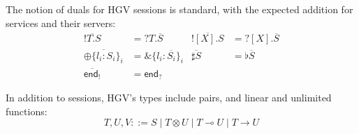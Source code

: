 \documentclass{easychair}
\newcommand{\key}{\mathsf}
\newcommand{\set}[1]{\{ #1 \}}
\newcommand{\row}[2]{\set{#1}_{#2}}
\newcommand{\gvOutput}[2]{\mathord{!}{#1}.{#2}}
\newcommand{\gvInput}[2]{\mathord{?}{#1}.{#2}}
\newcommand{\gvEndOutput}{\key{end}_!}
\newcommand{\gvEndInput}{\key{end}_?}
\newcommand{\gvPlus}[2]{\oplus \row{#1}{#2}}
\newcommand{\gvChoice}[2]{\binampersand \row{#1}{#2}}
\newcommand{\gvServer}[1]{\flat {#1}}
\newcommand{\gvService}[1]{\sharp {#1}}
\newcommand{\gvDual}[1]{\overline{#1}}
\newcommand{\gvOutputType}[2]{![{#1}].{#2}}
\newcommand{\gvInputType}[2]{?[{#1}].{#2}}
\newcommand{\la}{l}
\newcommand{\lolli}{\multimap}
\newcommand{\gvLinFun}[2]{{#1} \lolli {#2}}
\newcommand{\gvUnFun}[2]{{#1} \to {#2}}
\newcommand{\gvTimes}[2]{{#1} \otimes {#2}}
\newcommand{\gvUnitType}{\key{Unit}}
\newcommand{\un}[1]{\mathit{un}(#1)}
\newcommand{\lin}[1]{\mathit{lin}(#1)}
\newcommand{\hgv}{HGV\xspace}
\begin{document}
The notion of duals for \hgv sessions is standard, with the expected addition for services and their
servers:
\begin{align*}
  \gvDual{\gvOutput{T}{S}} &= \gvInput{T}{\gvDual{S}} & \gvDual{\gvOutputType{X}{S}} &= \gvInputType{X}{\gvDual{S}} \\
  \gvDual{\gvPlus{\la_i:S_i}{i}} &= \gvChoice{\la_i:\gvDual{S_i}}{i} & \gvDual{\gvService{S}} &= \gvServer{\gvDual{S}} \\
  \gvDual{\gvEndOutput} &= \gvEndInput
\end{align*}

In addition to sessions, \hgv's types include pairs, and linear and unlimited functions:
\[
T,U,V ::= S \mid \gvTimes{T}{U} \mid \gvLinFun{T}{U} \mid \gvUnFun{T}{U}
\]





\end{document}
